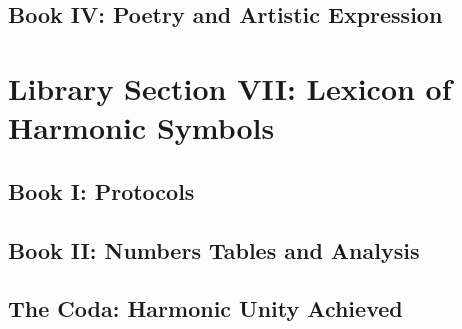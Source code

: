 \documentclass[a4paper,12pt]{book}
\begin{document}
\chapter{Book IV: Poetry and Artistic Expression}


\part{Library Section VII: Lexicon of Harmonic Symbols}

\chapter{Book I: Protocols}





\chapter{Book II: Numbers Tables and Analysis}




\chapter{The Coda: Harmonic Unity Achieved}

\end{document}
